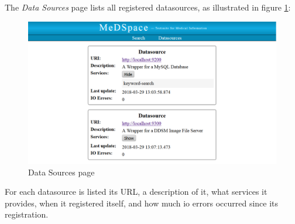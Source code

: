 The \emph{Data Sources} page lists all registered datasources, as illustrated in figure \ref{MeDSpaceDataSourcePage}: 

\begin{figure}[H]
	\begin{center}
		\includegraphics[width=1\textwidth]{figures/MeDSpace-GUI-Datasources.png}
	\end{center}
	\caption{Data Sources page}
	\label{MeDSpaceDataSourcePage}
\end{figure}

For each datasource is listed its URL, a description of it, what services it provides, when it registered itself, and how much io errors occurred since its registration.